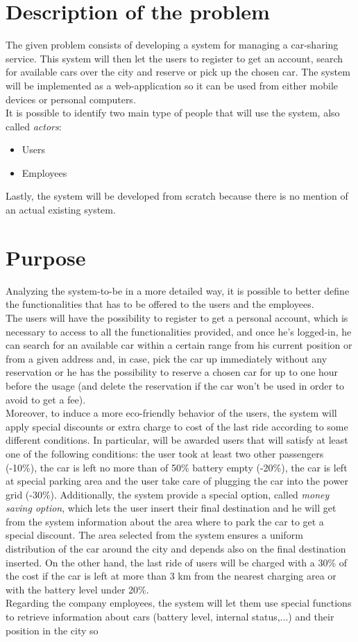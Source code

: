 \documentclass[11pt,a4paper]{report}
\begin{document}
\section{Description of the problem}
The given problem consists of developing a system for managing a car-sharing service. This system will then let the users to register to get an account, search for available cars over the city and reserve or pick up the chosen car. The system will be implemented as a web-application so it can be used from either mobile devices or personal computers.\\ 
It is possible to identify two main type of people that will use the system, also called \textit{actors}:
	\begin{itemize}
		\item Users
		\item Employees
	\end{itemize}
Lastly, the system will be developed from scratch because there is no mention of an actual existing system.

\section{Purpose}
Analyzing the system-to-be in a more detailed way, it is possible to better define the functionalities that has to be offered to the users and the employees.\\
The users will have the possibility to register to get a personal account, which is necessary to access to all the functionalities provided, and once he's logged-in, he can search for an available car within a certain range from his current position or from a given address and, in case, pick the car up immediately without any reservation or he has the possibility to reserve a chosen car for up to one hour before the usage (and delete the reservation if the car won't be used in order to avoid to get a fee). \\
Moreover, to induce a more eco-friendly behavior of the users, the system will apply special discounts or extra charge to cost of the last ride according to some different conditions. In particular, will be awarded users that will satisfy at least one of the following conditions: the user took at least two other passengers (-10\%), the car is 
left no more than of 50\% battery empty (-20\%), the car is left at special parking area and the user take care of plugging the car into the power grid (-30\%). Additionally, the system provide a special option, called \textit{money saving option}, which lets the user insert their final destination and he will get from the system information about the area where to park the car to get a special discount. The area selected from the system ensures a uniform distribution of the car around the city and depends also on the final destination inserted.
On the other hand, the last ride of users will be charged with a 30\% of the cost if the car is left at more than 3 km from the nearest charging area or with the battery level under 20\%.\\
Regarding the company employees, the system will let them use special functions to retrieve information about cars (battery level, internal status,...) and their position in the city so
\end{document}
